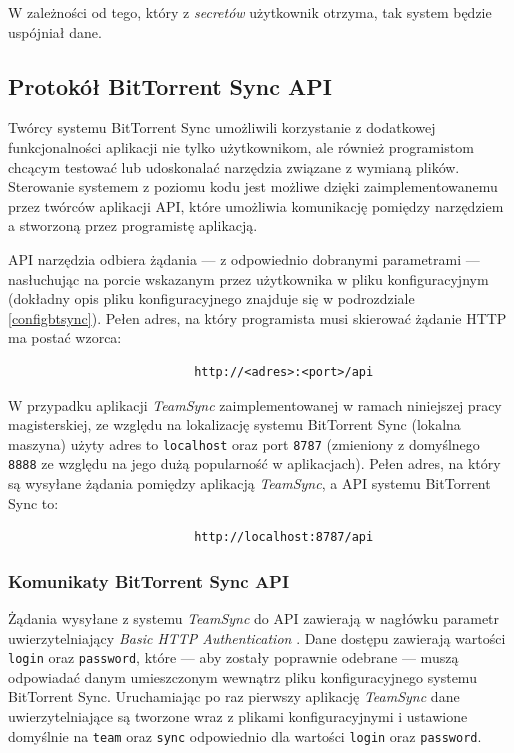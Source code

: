 W zależności od tego, który z \emph{secretów} użytkownik otrzyma, tak system będzie uspójniał dane.

\subsection{Protokół BitTorrent Sync API}

\label{btsyncapiproto}

Twórcy systemu BitTorrent Sync umożliwili korzystanie z dodatkowej funkcjonalności aplikacji nie tylko użytkownikom, ale również programistom chcącym testować lub udoskonalać narzędzia związane z wymianą plików. Sterowanie systemem z poziomu kodu jest możliwe dzięki zaimplementowanemu przez twórców aplikacji API, które umożliwia komunikację pomiędzy narzędziem a stworzoną przez programistę aplikacją.

API narzędzia odbiera żądania --- z odpowiednio dobranymi parametrami --- nasłuchując na porcie wskazanym przez użytkownika w pliku konfiguracyjnym (dokładny opis pliku konfiguracyjnego znajduje się w podrozdziale \ref{configbtsync}). Pełen adres, na który programista musi skierować żądanie HTTP ma postać wzorca:
\begin{verbatim}
                          http://<adres>:<port>/api
\end{verbatim}

W przypadku aplikacji \emph{TeamSync} zaimplementowanej w ramach niniejszej pracy magisterskiej, ze względu na lokalizację systemu BitTorrent Sync (lokalna maszyna) użyty adres to \texttt{localhost} oraz port \texttt{8787} (zmieniony z domyślnego \texttt{8888} ze względu na jego dużą popularność w aplikacjach). Pełen adres, na który są wysyłane żądania pomiędzy aplikacją \emph{TeamSync}, a API systemu BitTorrent Sync to:
\begin{verbatim}
                          http://localhost:8787/api
\end{verbatim}

\subsubsection*{Komunikaty BitTorrent Sync API}

Żądania wysyłane z systemu \emph{TeamSync} do API zawierają w nagłówku parametr uwierzytelniający \emph{Basic HTTP Authentication} \cite{basicauth}. Dane dostępu zawierają wartości \texttt{login} oraz \texttt{password}, które --- aby zostały poprawnie odebrane --- muszą odpowiadać danym umieszczonym wewnątrz pliku konfiguracyjnego systemu BitTorrent Sync. Uruchamiając po raz pierwszy aplikację \emph{TeamSync} dane uwierzytelniające są tworzone wraz z plikami konfiguracyjnymi i ustawione domyślnie na \texttt{team} oraz \texttt{sync} odpowiednio dla wartości \texttt{login} oraz \texttt{password}.

